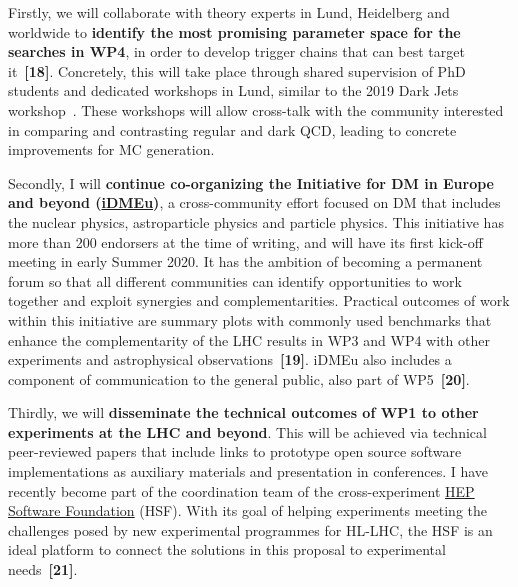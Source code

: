 Firstly, we will collaborate with theory experts in Lund, Heidelberg and worldwide to \textbf{identify the most promising parameter space for the searches in WP4}, in order to develop trigger chains that can best target it~\textbf{[18]}. 
Concretely, this will take place through shared supervision of PhD students and dedicated workshops in Lund, similar to the 2019 Dark Jets workshop~\cite{ToBeCited}. %
These workshops will allow cross-talk with the community interested in comparing and contrasting regular and dark QCD, leading to concrete improvements for MC generation. 

Secondly, I will \textbf{continue co-organizing the Initiative for DM in Europe and beyond (\href{https://indico.cern.ch/e/iDMEu/}{iDMEu})}, a cross-community effort focused on DM that includes the nuclear physics, astroparticle physics and particle physics. 
This initiative has more than 200 endorsers at the time of writing, and will have its first kick-off meeting in early Summer 2020. 
It has the ambition of becoming a permanent forum so that all different communities can identify opportunities to work together and exploit synergies and complementarities. 
Practical outcomes of work within this initiative are summary plots with commonly used benchmarks that enhance the complementarity of the LHC results in WP3 and WP4 with other experiments and astrophysical observations~\textbf{[19]}. iDMEu also includes a component of communication to the general public, also part of WP5~\textbf{[20]}. 

Thirdly, we will \textbf{disseminate the technical outcomes of WP1 to other experiments at the LHC and beyond}. 
This will be achieved via technical peer-reviewed papers that include links to prototype open source software implementations as auxiliary materials and presentation in conferences. 
I have recently become part of the coordination team of the cross-experiment \href{https://hepsoftwarefoundation.org}{HEP Software Foundation} (HSF). 
With its goal of helping experiments meeting the challenges posed by new experimental programmes for HL-LHC, the HSF is an ideal platform to connect the solutions in this proposal to experimental needs~\textbf{[21]}. 


